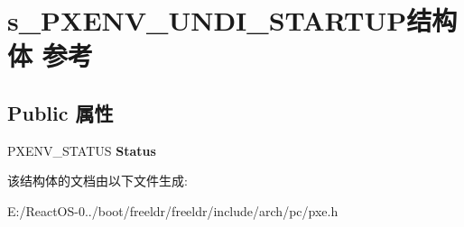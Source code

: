 \hypertarget{structs___p_x_e_n_v___u_n_d_i___s_t_a_r_t_u_p}{}\section{s\+\_\+\+P\+X\+E\+N\+V\+\_\+\+U\+N\+D\+I\+\_\+\+S\+T\+A\+R\+T\+U\+P结构体 参考}
\label{structs___p_x_e_n_v___u_n_d_i___s_t_a_r_t_u_p}
\subsection*{Public 属性}
\begin{DoxyCompactItemize}
\item 
\mbox{\label{structs___p_x_e_n_v___u_n_d_i___s_t_a_r_t_u_p_a6ac0978191127af160c92f0b0e0097d3}} 
P\+X\+E\+N\+V\+\_\+\+S\+T\+A\+T\+US {\bfseries Status}
\end{DoxyCompactItemize}


该结构体的文档由以下文件生成\+:\begin{DoxyCompactItemize}
\item 
E\+:/\+React\+O\+S-\/0../boot/freeldr/freeldr/include/arch/pc/pxe.\+h\end{DoxyCompactItemize}
